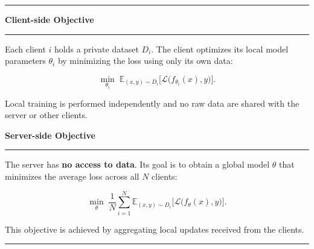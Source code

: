 \begin{center}
    \hrule
    \vspace{0.3cm}
    
    \begin{minipage}[t]{0.47\textwidth}
    \centering
    \textbf{Client-side Objective}
    
    \vspace{0.2cm}
    \hrule
    \vspace{0.2cm}
    
    Each client $i$ holds a private dataset $D_i$.  
    The client optimizes its local model parameters $\theta_i$ by minimizing the loss
    using only its own data:
    
    \[
    \min_{\theta_i}
    \;
    \mathbb{E}_{(x,y)\sim D_i}
    \bigl[
    \mathcal{L}\bigl(f_{\theta_i}(x), y\bigr)
    \bigr].
    \]
    
    \vspace{0.15cm}
    
    Local training is performed independently and no raw data are shared with the server
    or other clients.
    
    \end{minipage}
    \hfill
    \begin{minipage}[t]{0.47\textwidth}
    \centering
    \textbf{Server-side Objective}
    
    \vspace{0.2cm}
    \hrule
    \vspace{0.2cm}
    
    The server has \textbf{no access to data}. Its goal is to obtain a global model
    $\theta$ that minimizes the average loss across all $N$ clients:
    
    \[
    \min_{\theta}
    \;
    \frac{1}{N}
    \sum_{i=1}^{N}
    \mathbb{E}_{(x,y)\sim D_i}
    \bigl[
    \mathcal{L}\bigl(f_{\theta}(x), y\bigr)
    \bigr].
    \]
    
    \vspace{0.15cm}
    
    This objective is achieved by aggregating local updates received from the clients.
    
    \end{minipage}
    
    \vspace{0.3cm}
\hrule
\end{center}

\vspace{0.3cm}

